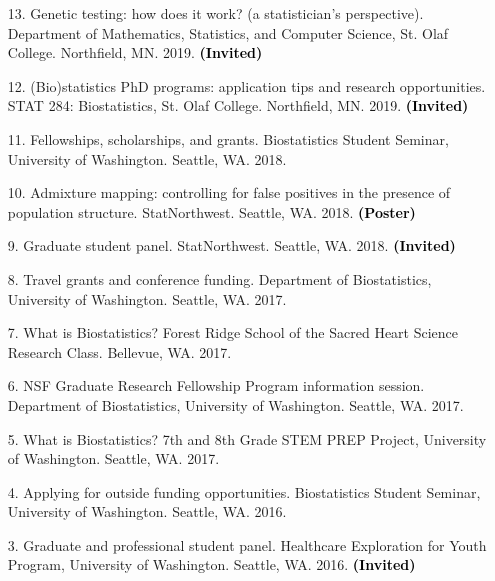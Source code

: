 \documentclass[margin]{res}
\newcommand{\annotate}[1]{\textcolor{black}{\textbf{(#1)}}}
\begin{document}
\begin{resume}
\begin{itemize}
\item[13.] Genetic testing: how does it work? (a statistician's perspective). 
Department of Mathematics, Statistics, and Computer Science, St. Olaf College. Northfield, MN. 2019. 
\annotate{Invited}

\item[12.] (Bio)statistics PhD programs: application tips and research opportunities. 
STAT 284: Biostatistics, St. Olaf College. Northfield, MN. 2019. 
\annotate{Invited}

\item[11.] Fellowships, scholarships, and grants. 
Biostatistics Student Seminar, University of Washington. Seattle, WA. 2018.

\item[10.] %
Admixture mapping: controlling for false positives in the presence of population structure. 
StatNorthwest. Seattle, WA. 2018. 
\annotate{Poster}%

\item[9.] Graduate student panel. 
StatNorthwest. Seattle, WA. 2018. 
\annotate{Invited}

\item[8.] %
Travel grants and conference funding. 
Department of Biostatistics, University of Washington. Seattle, WA. 2017.

\item[7.] %
What is Biostatistics? 
Forest Ridge School of the Sacred Heart Science Research Class. Bellevue, WA. 2017.

\item[6.] %
NSF Graduate Research Fellowship Program information session. 
Department of Biostatistics, University of Washington. Seattle, WA. 2017.

\item[5.] %
What is Biostatistics? 
7th and 8th Grade STEM PREP Project, University of Washington. Seattle, WA. 2017. %

\item[4.] %
Applying for outside funding opportunities. 
Biostatistics Student Seminar, University of Washington. Seattle, WA. 2016.

\item[3.] Graduate and professional student panel. 
Healthcare Exploration for Youth Program, University of Washington. Seattle, WA. 2016. 
\annotate{Invited}


\end{itemize}
\end{resume}
\end{document}
